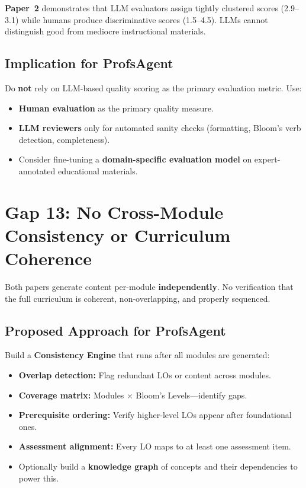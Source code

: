 \documentclass[11pt,a4paper]{article}
\begin{document}
\textbf{Paper~2} demonstrates that LLM evaluators assign tightly clustered scores (2.9--3.1) while humans produce discriminative scores (1.5--4.5). LLMs cannot distinguish good from mediocre instructional materials.

\subsection{Implication for ProfsAgent}
Do \textbf{not} rely on LLM-based quality scoring as the primary evaluation metric. Use:
\begin{itemize}[nosep]
    \item \textbf{Human evaluation} as the primary quality measure.
    \item \textbf{LLM reviewers} only for automated sanity checks (formatting, Bloom's verb detection, completeness).
    \item Consider fine-tuning a \textbf{domain-specific evaluation model} on expert-annotated educational materials.
\end{itemize}

\section{Gap 13: No Cross-Module Consistency or Curriculum Coherence}

Both papers generate content per-module \textbf{independently}. No verification that the full curriculum is coherent, non-overlapping, and properly sequenced.

\subsection{Proposed Approach for ProfsAgent}
Build a \textbf{Consistency Engine} that runs after all modules are generated:
\begin{itemize}[nosep]
    \item \textbf{Overlap detection:} Flag redundant LOs or content across modules.
    \item \textbf{Coverage matrix:} Modules $\times$ Bloom's Levels---identify gaps.
    \item \textbf{Prerequisite ordering:} Verify higher-level LOs appear after foundational ones.
    \item \textbf{Assessment alignment:} Every LO maps to at least one assessment item.
    \item Optionally build a \textbf{knowledge graph} of concepts and their dependencies to power this.
\end{itemize}
\end{document}
